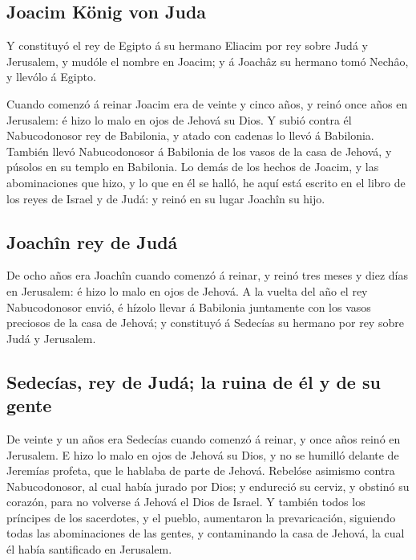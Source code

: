 \hypertarget{joacim-kuxf6nig-von-juda}{%
\subsection{Joacim König von Juda}\label{joacim-kuxf6nig-von-juda}}

 Y constituyó el rey de Egipto á su hermano Eliacim por rey
sobre Judá y Jerusalem, y mudóle el nombre en Joacim; y á Joachâz su
hermano tomó Nechâo, y llevólo á Egipto.

 Cuando comenzó á reinar Joacim era de veinte y cinco años,
y reinó once años en Jerusalem: é hizo lo malo en ojos de Jehová su
Dios.  Y subió contra él Nabucodonosor rey de Babilonia, y
atado con cadenas lo llevó á Babilonia.  También llevó
Nabucodonosor á Babilonia de los vasos de la casa de Jehová, y púsolos
en su templo en Babilonia.  Lo demás de los hechos de
Joacim, y las abominaciones que hizo, y lo que en él se halló, he aquí
está escrito en el libro de los reyes de Israel y de Judá: y reinó en su
lugar Joachîn su hijo.

\hypertarget{joachuxeen-rey-de-juduxe1}{%
\subsection{Joachîn rey de Judá}\label{joachuxeen-rey-de-juduxe1}}

 De ocho años era Joachîn cuando comenzó á reinar, y reinó
tres meses y diez días en Jerusalem: é hizo lo malo en ojos de Jehová.
 A la vuelta del año el rey Nabucodonosor envió, é hízolo
llevar á Babilonia juntamente con los vasos preciosos de la casa de
Jehová; y constituyó á Sedecías su hermano por rey sobre Judá y
Jerusalem.

\hypertarget{sedecuxedas-rey-de-juduxe1-la-ruina-de-uxe9l-y-de-su-gente}{%
\subsection{Sedecías, rey de Judá; la ruina de él y de su
gente}\label{sedecuxedas-rey-de-juduxe1-la-ruina-de-uxe9l-y-de-su-gente}}

 De veinte y un años era Sedecías cuando comenzó á reinar,
y once años reinó en Jerusalem.  E hizo lo malo en ojos de
Jehová su Dios, y no se humilló delante de Jeremías profeta, que le
hablaba de parte de Jehová.  Rebelóse asimismo contra
Nabucodonosor, al cual había jurado por Dios; y endureció su cerviz, y
obstinó su corazón, para no volverse á Jehová el Dios de Israel.
 Y también todos los príncipes de los sacerdotes, y el
pueblo, aumentaron la prevaricación, siguiendo todas las abominaciones
de las gentes, y contaminando la casa de Jehová, la cual él había
santificado en Jerusalem.

